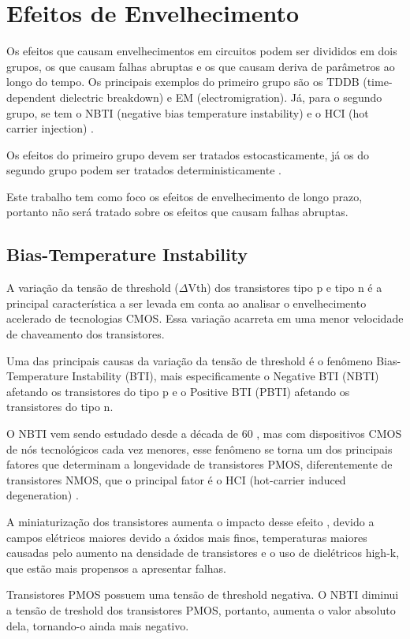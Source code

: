 \section{Efeitos de Envelhecimento}
Os efeitos que causam envelhecimentos em circuitos podem ser divididos em dois grupos, os que causam falhas abruptas e os que causam deriva de parâmetros ao longo do tempo. Os principais exemplos do primeiro grupo são os TDDB (time-dependent dielectric breakdown) e EM (electromigration). Já, para o segundo grupo, se tem o NBTI (negative bias temperature instability) e o HCI (hot carrier injection) \cite{Lorenz}.

Os efeitos do primeiro grupo devem ser tratados estocasticamente, já os do segundo grupo podem ser tratados deterministicamente \cite{Lorenz}.
       
Este trabalho tem como foco os efeitos de envelhecimento de longo prazo, portanto não será tratado sobre os efeitos que causam falhas abruptas.

\subsection{Bias-Temperature Instability}
A variação da tensão de threshold ($\Delta$Vth) dos transistores tipo p e tipo n é a principal característica a ser levada em conta ao analisar o envelhecimento acelerado de tecnologias CMOS. Essa variação acarreta em uma menor velocidade de chaveamento dos transistores.

Uma das principais causas da variação da tensão de threshold é o fenômeno Bias-Temperature Instability (BTI), mais especificamente o Negative BTI (NBTI) afetando os transistores do tipo p e o Positive BTI (PBTI) afetando os transistores do tipo n.

O NBTI vem sendo estudado desde a década de 60 \cite{Alam}, mas com dispositivos CMOS de nós tecnológicos cada vez menores, esse fenômeno se torna um dos principais fatores que determinam a longevidade de transistores PMOS, diferentemente de transistores NMOS, que o principal fator é o HCI (hot-carrier induced degeneration) \cite{Bhardwaj}.

A miniaturização dos transistores aumenta o impacto desse efeito \cite{Banaszeski}, devido a campos elétricos maiores devido a óxidos mais finos, temperaturas maiores causadas pelo aumento na densidade de transistores e o uso de dielétricos high-k, que estão mais propensos a apresentar falhas.

Transistores PMOS possuem uma tensão de threshold negativa. O NBTI diminui a tensão de treshold dos transistores PMOS, portanto, aumenta o valor absoluto dela, tornando-o ainda mais negativo.




% 
